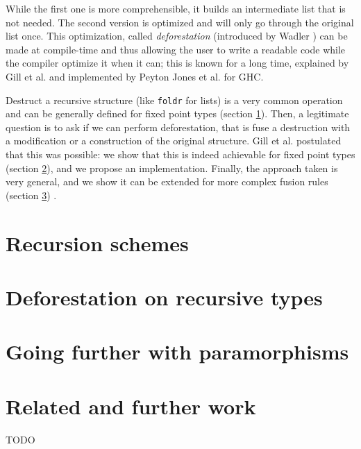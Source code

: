 \documentclass[format=sigplan]{acmart}
\newcommand{\minline}[1]{\texttt{#1}}
\begin{document}
\noindent While the first one is more comprehensible, it builds an intermediate list that is not needed. The second version is optimized and will only go through the original list once.
This optimization, called \emph{deforestation} (introduced by Wadler \cite{WADLER1990231}) can be made at compile-time and thus allowing the user to write a readable code while the compiler optimize it when it can; this is known for a long time, explained by Gill et al. \cite{Gill:1993:SCD:165180.165214} and implemented by Peyton Jones et al. \cite{pbr} for GHC.

Destruct a recursive structure (like \minline{foldr} for lists) is a very common operation and can be generally defined for fixed point types (section \ref{sec:recschemes}). Then, a legitimate question is to ask if we can perform deforestation, that is fuse a destruction with a modification or a construction of the original structure. Gill et al. postulated that this was possible: we show that this is indeed achievable for fixed point types (section \ref{sec:rectypes}), and we propose an implementation.
Finally, the approach taken is very general, and we show it can be extended for more complex fusion rules (section \ref{sec:para}) .

\section{Recursion schemes}
\label{sec:recschemes}


\section{Deforestation on recursive types}
\label{sec:rectypes}


\section{Going further with paramorphisms}
\label{sec:para}


\section{Related and further work}
\label{sec:related}


\begin{acks}
TODO
\end{acks}




\end{document}
